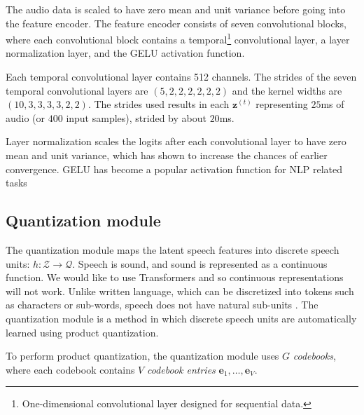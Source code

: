 The audio data is scaled to have zero mean and unit variance before going into the feature encoder. 
The feature encoder consists of seven convolutional blocks, where each convolutional block contains a temporal\footnote{One-dimensional convolutional layer designed for sequential data.} convolutional layer, 
a layer normalization layer, and the GELU activation function.

Each temporal convolutional layer contains 512 channels. 
The strides of the seven temporal convolutional layers are $(5,2,2,2,2,2,2)$ and the kernel widths are $(10,3,3,3,3,2,2)$.
The strides used results in each $\mathbf{z}^{(t)}$ representing $25$ms of audio (or $400$ input samples),
strided by about $20$ms.

Layer normalization scales the logits after each convolutional layer to have zero mean and unit variance, which has shown to increase the chances of earlier convergence.
GELU has become a popular activation function for NLP related tasks



\subsection{Quantization module}
The quantization module maps the latent speech features into discrete speech units: $h: \mathcal{Z} \rightarrow \mathcal{Q}$.
Speech is sound, and sound is represented as a continuous function. We would like to use Transformers and so continuous representations will not work. 
Unlike written language, which can be discretized into tokens such as characters or sub-words, speech does not have natural sub-units \cite{bgn2021illustrated}. 
The quantization module is a method in which discrete speech units are automatically learned using product quantization.

To perform product quantization, the quantization module uses $G$ \emph{codebooks}, where each codebook contains $V$ \emph{codebook entries} $\mathbf{e}_{1}, \dots, \mathbf{e}_{V}$.

